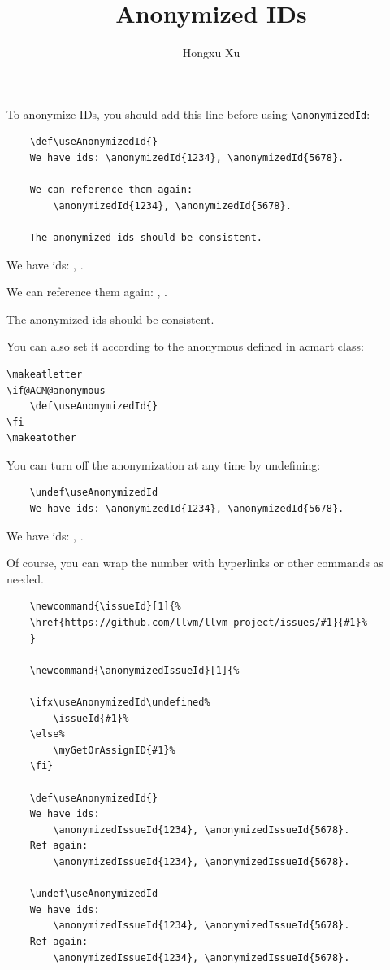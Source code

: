 \documentclass{article}
\begin{document}
\title{Anonymized IDs}
\author{Hongxu Xu}

\maketitle

To anonymize IDs, you should add this line before using \texttt{\textbackslash anonymizedId}:
\begin{verbatim}
    \def\useAnonymizedId{}
    We have ids: \anonymizedId{1234}, \anonymizedId{5678}.

    We can reference them again:
        \anonymizedId{1234}, \anonymizedId{5678}.

    The anonymized ids should be consistent.
\end{verbatim}

\begin{tcolorbox}
\def\useAnonymizedId{}
We have ids: , .

We can reference them again:
    , .

The anonymized ids should be consistent.
\end{tcolorbox}

You can also set it according to the anonymous defined in acmart class:
\begin{verbatim}
\makeatletter
\if@ACM@anonymous
    \def\useAnonymizedId{}
\fi
\makeatother
\end{verbatim}

You can turn off the anonymization at any time by undefining:
\begin{verbatim}
    \undef\useAnonymizedId
    We have ids: \anonymizedId{1234}, \anonymizedId{5678}.
\end{verbatim}

\begin{tcolorbox}
\undef\useAnonymizedId
We have ids: , .
\end{tcolorbox}

Of course, you can wrap the number with hyperlinks or other commands as needed.
\begin{verbatim}
    \newcommand{\issueId}[1]{%
    \href{https://github.com/llvm/llvm-project/issues/#1}{#1}%
    }

    \newcommand{\anonymizedIssueId}[1]{%

    \ifx\useAnonymizedId\undefined%
        \issueId{#1}%
    \else%
        \myGetOrAssignID{#1}%
    \fi}

    \def\useAnonymizedId{}
    We have ids:
        \anonymizedIssueId{1234}, \anonymizedIssueId{5678}.
    Ref again:
        \anonymizedIssueId{1234}, \anonymizedIssueId{5678}.

    \undef\useAnonymizedId
    We have ids:
        \anonymizedIssueId{1234}, \anonymizedIssueId{5678}.
    Ref again:
        \anonymizedIssueId{1234}, \anonymizedIssueId{5678}.
\end{verbatim}
\end{document}
